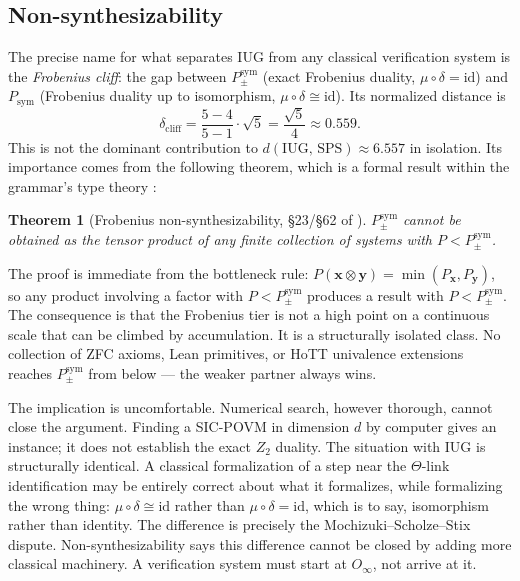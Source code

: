 \documentclass[12pt]{article}
\theoremstyle{plain}
\newtheorem{theoreminner}{Theorem}[section]
\theoremstyle{definition}
\theoremstyle{remark}
\newenvironment{theorem}{\begin{mdframed}[style=thmstyle]\begin{theoreminner}}{\end{theoreminner}\end{mdframed}}
\begin{document}
\subsection{Non-synthesizability}
\label{subsec:nonsyn}

The precise name for what separates IUG from any classical verification system is the
\emph{Frobenius cliff}: the gap between $P_\pm^\text{sym}$ (exact Frobenius duality,
$\mu \circ \delta = \text{id}$) and $P_\text{sym}$ (Frobenius duality up to isomorphism,
$\mu \circ \delta \cong \text{id}$). Its normalized distance is
\[
  \delta_\text{cliff} = \frac{5-4}{5-1}\cdot\sqrt{5} = \frac{\sqrt{5}}{4} \approx 0.559.
\]
This is not the dominant contribution to $d(\text{IUG},\,\text{SPS}) \approx 6.557$ in
isolation. Its importance comes from the following theorem, which is a formal result within
the grammar's type theory \cite{synthref}:

\begin{theorem}[Frobenius non-synthesizability, §23/§62 of \cite{synthref}]
  \label{thm:nonsyn}
  $P_\pm^\text{sym}$ cannot be obtained as the tensor product of any finite collection of
  systems with $P < P_\pm^\text{sym}$.
\end{theorem}

\noindent
The proof is immediate from the bottleneck rule: $P(\mathbf{x} \otimes \mathbf{y}) = \min(P_\mathbf{x}, P_\mathbf{y})$,
so any product involving a factor with $P < P_\pm^\text{sym}$ produces a result with
$P < P_\pm^\text{sym}$. The consequence is that the Frobenius tier is not a high point
on a continuous scale that can be climbed by accumulation. It is a structurally isolated
class. No collection of ZFC axioms, Lean primitives, or HoTT univalence extensions reaches
$P_\pm^\text{sym}$ from below --- the weaker partner always wins.

The implication is uncomfortable. Numerical search, however thorough, cannot close the
argument. Finding a SIC-POVM in dimension $d$ by computer gives an instance; it does not
establish the exact $Z_2$ duality. The situation with IUG is structurally identical.
A classical formalization of a step near the $\Theta$-link identification may
be entirely correct about what it formalizes, while formalizing the wrong thing:
$\mu \circ \delta \cong \text{id}$ rather than $\mu \circ \delta = \text{id}$, which is
to say, isomorphism rather than identity. The difference is precisely the Mochizuki--Scholze--Stix
dispute. Non-synthesizability says this difference cannot be closed by adding more classical
machinery. A verification system must start at $O_\infty$, not arrive at it.
\end{document}

